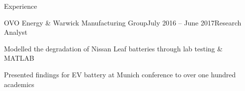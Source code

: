 \documentclass{resume} %
\begin{document}
\begin{rSection}{Experience}
\begin{rSubsection}{OVO Energy \& Warwick Manufacturing Group}{July 2016 – June 2017}{Research Analyst}{}
\normalfont
\item Modelled the degradation of Nissan Leaf batteries through lab testing \& MATLAB %
\item Presented findings for EV battery at Munich conference to over one hundred academics %
\end{rSubsection}

\end{rSection}

\end{document}
